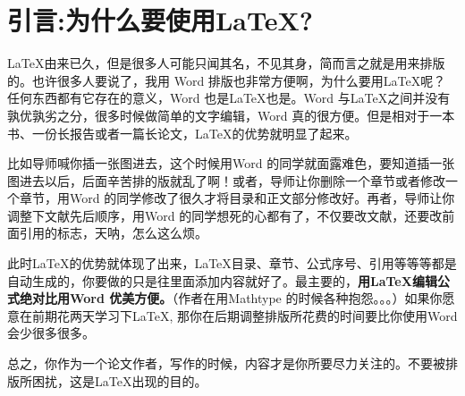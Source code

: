 {}
\chapter*{引言:为什么要使用\LaTeX?}
\LaTeX 由来已久，但是很多人可能只闻其名，不见其身，简而言之就是用来排版的。也许很多人要说了，我用 Word 排版也非常方便啊，为什么要用\LaTeX 呢？任何东西都有它存在的意义，Word 也是\LaTeX 也是。Word 与\LaTeX 之间并没有孰优孰劣之分，很多时候做简单的文字编辑，Word 真的很方便。但是相对于一本书、一份长报告或者一篇长论文，\LaTeX 的优势就明显了起来。

比如导师喊你插一张图进去，这个时候用Word 的同学就面露难色，要知道插一张图进去以后，后面辛苦排的版就乱了啊！或者，导师让你删除一个章节或者修改一个章节，用Word 的同学修改了很久才将目录和正文部分修改好。再者，导师让你调整下文献先后顺序，用Word 的同学想死的心都有了，不仅要改文献，还要改前面引用的标志，天呐，怎么这么烦。

此时\LaTeX 的优势就体现了出来，\LaTeX 目录、章节、公式序号、引用等等等都是自动生成的，你要做的只是往里面添加内容就好了。最主要的，\textbf{用\LaTeX 编辑公式绝对比用Word 优美方便。}（作者在用Mathtype 的时候各种抱怨。。。）如果你愿意在前期花两天学习下\LaTeX, 那你在后期调整排版所花费的时间要比你使用Word 会少很多很多。

总之，你作为一个论文作者，写作的时候，内容才是你所要尽力关注的。不要被排版所困扰，这是\LaTeX 出现的目的。


